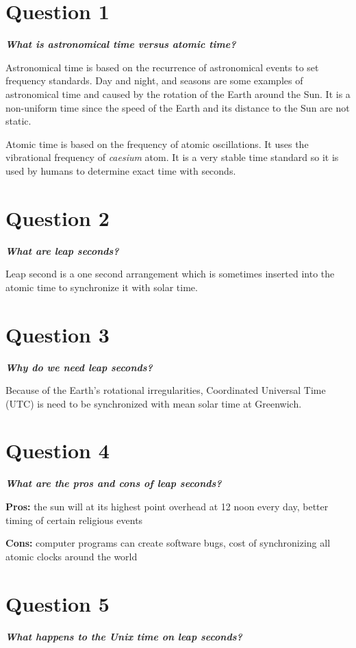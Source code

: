 \documentclass[12pt,letterpaper]{article}
\begin{document}
\section*{Question 1}

\textbf{\textit{What is astronomical time versus atomic time?}}

Astronomical time is based on the recurrence of astronomical events to set frequency standards. Day and night, and seasons are some examples of astronomical time and caused by the rotation of the Earth around the Sun. It is a non-uniform time since the speed of the Earth and its distance to the Sun are not static. 

Atomic time is based on the frequency of atomic oscillations. It uses the vibrational frequency of \textit{caesium} atom. It is a very stable time standard so it is used by humans to determine exact time with seconds.

\section*{Question 2}
\textbf{\textit{What are leap seconds?}} 

Leap second is a one second arrangement which is sometimes inserted into the atomic time to synchronize it with solar time. 

\section*{Question 3}
\textbf{\textit{Why do we need leap seconds?}} 

Because of the Earth's rotational irregularities, Coordinated Universal Time (UTC) is need to be synchronized with mean solar time at Greenwich. 

\section*{Question 4}
\textbf{\textit{What are the pros and cons of leap seconds?}}

\textbf{Pros:} the sun will at its highest point overhead at 12 noon every day, better timing of certain religious events 

\textbf{Cons:} computer programs can create software bugs, cost of synchronizing all atomic clocks around the world 


\section*{Question 5}
\textbf{\textit{What happens to the Unix time on leap seconds?}} 
\end{document}
